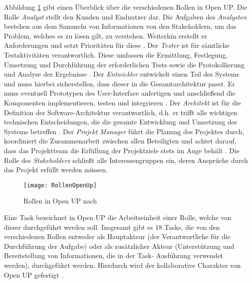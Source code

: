 Abbildung \ref{fig:RollenOpenUp} gibt einen Überblick über die verschiedenen Rollen in Open UP. Die Rolle \textit{Analyst} stellt den Kunden und Endnutzer dar. Die Aufgaben des \textit{Analysten} bestehen aus dem Sammeln von Informationen von den Stakeholdern, um das Problem, welches es zu lösen gilt, zu verstehen. Weiterhin erstellt er Anforderungen und setzt Prioritäten für diese \cite{OpenUPProcess}.\newline
Der \textit{Tester} ist für sämtliche Testaktivitäten verantwortlich. Diese umfassen die Ermittlung, Festlegung, Umsetzung und Durchführung der erforderlichen Tests sowie die Protokollierung und Analyse der Ergebnisse \cite{OpenUPProcess}.
Der \textit{Entwickler} entwickelt einen Teil des Systems und muss hierbei sicherstellen, dass dieser in die Gesamtarchitektur passt. Er muss eventuell Prototypen des User-Interface anfertigen und anschließend die Komponenten implementieren, testen und integrieren \cite{OpenUPProcess}.\newline
Der \textit{Architekt} ist für die Definition der Software-Architektur verantwortlich, d.h. er trifft alle wichtigen technischen Entscheidungen, die die gesamte Entwicklung und Umsetzung des Systems betreffen \cite{OpenUPProcess}.\newline
Der \textit{Projekt Manager} führt die Planung des Projektes durch, koordiniert die Zusammenarbeit zwischen allen Beteiligten und achtet darauf, dass das Projektteam die Erfüllung der Projektziele stets im Auge behält \cite{OpenUPProcess}.\newline
Die Rolle des \textit{Stakeholders} schließt alle Interessengruppen ein, deren Ansprüche durch das Projekt erfüllt werden müssen. \newline

\begin{figure}[htp]
\begin{center}
  \texttt{[image: RollenOpenUp]} %
  \caption{Rollen in Open UP nach \cite{openup}}
  \label{fig:RollenOpenUp}
\end{center}
\end{figure}

Eine Task bezeichnet in Open UP die Arbeitseinheit einer Rolle, welche von dieser durchgeführt werden soll. Insgesamt gibt es 18 Tasks, die von den verschiedenen Rollen entweder als Hauptakteur (der Verantwortliche für die Durchführung der Aufgabe) oder als zusätzlicher Akteur (Unterstützung und Bereitstellung von Informationen, die in der Task- Ausführung verwendet werden), durchgeführt werden. Hierdurch wird der kollaborative Charakter von Open UP gefestigt \cite{eclipseopenup}.

